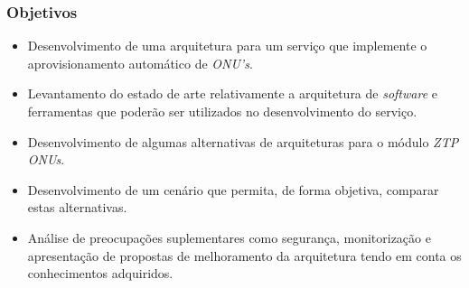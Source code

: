 \begin{frame}
    \frametitle{\checkmark \hspace{1mm} Objetivos}
    \begin{itemize}
        \item Desenvolvimento de uma arquitetura para um serviço que implemente
        o aprovisionamento automático de \textit{ONU's}.
        \item Levantamento do estado de arte relativamente a arquitetura de
        \textit{software} e ferramentas que poderão ser utilizados no
        desenvolvimento do serviço.
        \item Desenvolvimento de algumas alternativas de arquiteturas para o
        módulo \textit{ZTP ONUs}.
        \item Desenvolvimento de um cenário que permita, de forma objetiva,
        comparar estas alternativas. 
        \item Análise de preocupações suplementares como segurança,
        monitorização e apresentação de propostas de melhoramento da arquitetura
        tendo em conta os conhecimentos adquiridos. 
    \end{itemize}
\end{frame}